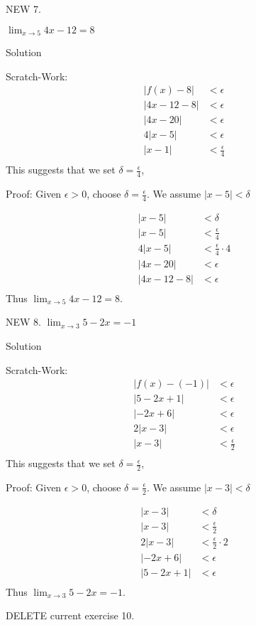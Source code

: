 \documentclass[10pt]{article}
\newcommand{\ds}{\displaystyle}
\begin{document}
NEW 7.

$\ds \lim_{x\to 5} {4x-12}=8$

Solution   

Scratch-Work:
 \small
\begin{align*}
|f(x)-8|&<\epsilon \\
|4x-12-8|&<\epsilon \\
|4x-20|&<\epsilon\\
4|x-5|&<\epsilon \\
|x-1|&<\frac{\epsilon}{4}\\
\end{align*}
\normalsize
This suggests that we set $\delta=\frac{\epsilon}{4}$,

Proof:
Given $\epsilon>0$, choose $\ds \delta=\frac{\epsilon}{4}$. We assume $|x-5|<\delta$

\small
\begin{align*}
|x - 5| &< \delta \\
|x - 5| &< \frac{\epsilon}{4} \\
4|x - 5| &< \frac{\epsilon}{4}\cdot 4\\
|4x-20|&< \epsilon \\
|4x-12-8|&< \epsilon  \\
\end{align*}
\normalsize
Thus  $\ds \lim_{x\to 5} {4x-12}=8$.

NEW 8.
$\ds \lim_{x\to 3} 5-2x=-1$

Solution   

Scratch-Work:
 \small
\begin{align*}
|f(x)-(-1)|&<\epsilon \\
|5-2x+1|&<\epsilon \\
|-2x+6|&<\epsilon\\
2|x-3|&<\epsilon \\
|x-3|&<\frac{\epsilon}{2}\\
\end{align*}
\normalsize
This suggests that we set $\delta=\frac{\epsilon}{2}$,

Proof:
Given $\epsilon>0$, choose $\ds \delta=\frac{\epsilon}{2}$. We assume $|x-3|<\delta$

\small
\begin{align*}
|x - 3| &< \delta \\
|x - 3| &< \frac{\epsilon}{2} \\
2|x - 3| &< \frac{\epsilon}{2}\cdot 2\\
|-2x+6|&< \epsilon \\
|5-2x+1|&< \epsilon  \\
\end{align*}
\normalsize
Thus  $\ds \lim_{x\to 3} 5-2x=-1$.

DELETE current exercise 10.
\end{document}
